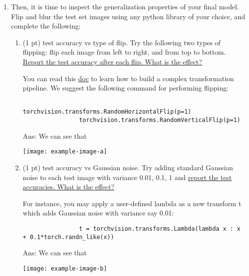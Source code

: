 \documentclass[10pt]{article}
\newcommand{\ans}[1]{{\color{blue}\textsf{Ans}: #1}}
\newcommand{\red}[1]{{\color{red}#1}}
\newcommand{\magenta}[1]{{\color{magenta}#1}}
\begin{document}
\begin{exercise}
\begin{enumerate}
			\ans{%
			\begin{center}
				\texttt{[image: example-image-a]}\texttt{[image: example-image-b]}\\
					\texttt{[image: example-image-c]}\texttt{[image: example-image-a]}\\
			\end{center}
			}
			
			\item Then, it is time to inspect the generalization properties of your final model. Flip and blur the \red{test set images} using any python library of your choice, and complete the following:		
			\begin{enumerate}[resume]
				\item (1 pt) test accuracy vs type of flip. Try the following two types of flipping: flip each image from left to right, and from top to bottom. \uline{Report the test accuracy after each flip. What is the effect?}
				
				You can read this \href{https://pytorch.org/vision/stable/transforms.html}{\magenta{doc}} to learn how to build a complex transformation pipeline. We suggest the following command for performing flipping: 
				\begin{verbatim}
				torchvision.transforms.RandomHorizontalFlip(p=1)
				torchvision.transforms.RandomVerticalFlip(p=1)
				\end{verbatim}
				
				\ans{We can see that 
				\begin{center}
				\texttt{[image: example-image-a]}
				\end{center}
				}
						
				\item (1 pt) test accuracy vs Gaussian noise. Try adding standard Gaussian noise to each test image with variance 0.01, 0.1, 1 and \uline{report the test accuracies. What is the effect?}
				
				For instance, you may apply a user-defined lambda as a new transform t which adds Gaussian noise with variance say 0.01: 
				\begin{verbatim}
				t = torchvision.transforms.Lambda(lambda x : x + 0.1*torch.randn_like(x))
				\end{verbatim}
				
				\ans{We can see that
				\begin{center}
				\texttt{[image: example-image-b]}
				\end{center}
				}			
			\end{enumerate} 
			

\end{enumerate}
\end{exercise}
\end{document}
